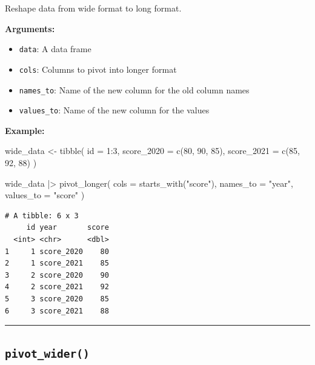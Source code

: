 \documentclass[
  letterpaper,
  DIV=11,
  numbers=noendperiod]{scrreprt}
\newenvironment{Shaded}{\begin{snugshade}}{\end{snugshade}}
\newcommand{\AttributeTok}[1]{\textcolor[rgb]{0.40,0.45,0.13}{#1}}
\newcommand{\DecValTok}[1]{\textcolor[rgb]{0.68,0.00,0.00}{#1}}
\newcommand{\FunctionTok}[1]{\textcolor[rgb]{0.28,0.35,0.67}{#1}}
\newcommand{\NormalTok}[1]{\textcolor[rgb]{0.00,0.23,0.31}{#1}}
\newcommand{\OtherTok}[1]{\textcolor[rgb]{0.00,0.23,0.31}{#1}}
\newcommand{\SpecialCharTok}[1]{\textcolor[rgb]{0.37,0.37,0.37}{#1}}
\newcommand{\StringTok}[1]{\textcolor[rgb]{0.13,0.47,0.30}{#1}}
\providecommand{\tightlist}{%
  \setlength{\itemsep}{0pt}\setlength{\parskip}{0pt}}
\begin{document}
Reshape data from wide format to long format.

\textbf{Arguments:}

\begin{itemize}
\tightlist
\item
  \texttt{data}: A data frame
\item
  \texttt{cols}: Columns to pivot into longer format
\item
  \texttt{names\_to}: Name of the new column for the old column names
\item
  \texttt{values\_to}: Name of the new column for the values
\end{itemize}

\textbf{Example:}

\begin{Shaded}
\begin{Highlighting}[]
\NormalTok{wide\_data }\OtherTok{\textless{}{-}} \FunctionTok{tibble}\NormalTok{(}
  \AttributeTok{id =} \DecValTok{1}\SpecialCharTok{:}\DecValTok{3}\NormalTok{,}
  \AttributeTok{score\_2020 =} \FunctionTok{c}\NormalTok{(}\DecValTok{80}\NormalTok{, }\DecValTok{90}\NormalTok{, }\DecValTok{85}\NormalTok{),}
  \AttributeTok{score\_2021 =} \FunctionTok{c}\NormalTok{(}\DecValTok{85}\NormalTok{, }\DecValTok{92}\NormalTok{, }\DecValTok{88}\NormalTok{)}
\NormalTok{)}

\NormalTok{wide\_data }\SpecialCharTok{|\textgreater{}}
  \FunctionTok{pivot\_longer}\NormalTok{(}
    \AttributeTok{cols =} \FunctionTok{starts\_with}\NormalTok{(}\StringTok{"score"}\NormalTok{),}
    \AttributeTok{names\_to =} \StringTok{"year"}\NormalTok{,}
    \AttributeTok{values\_to =} \StringTok{"score"}
\NormalTok{  )}
\end{Highlighting}
\end{Shaded}

\begin{verbatim}
# A tibble: 6 x 3
     id year       score
  <int> <chr>      <dbl>
1     1 score_2020    80
2     1 score_2021    85
3     2 score_2020    90
4     2 score_2021    92
5     3 score_2020    85
6     3 score_2021    88
\end{verbatim}

\begin{center}\rule{0.5\linewidth}{0.5pt}\end{center}

\subsection{\texorpdfstring{\texttt{pivot\_wider()}}{pivot\_wider()}}\label{pivot_wider}
\end{document}
